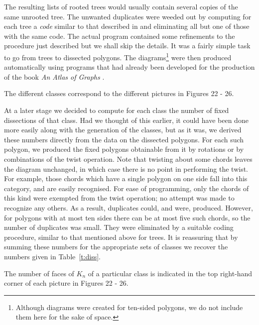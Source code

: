 \documentclass[10pt]{amsart}
\begin{document}
    The resulting lists of rooted trees would usually contain several copies of the same unrooted tree.   The unwanted duplicates were weeded out by computing for each tree a {\em code} similar to that described in \cite{r2} and eliminating all but one of those with the same code.   The actual program contained some refinements to the procedure just described but we shall skip the details. It was a fairly simple task to go from trees to dissected polygons.  The diagrams\footnote{Although diagrams were created for ten-sided polygons, we do not include them here for the sake of space.} were then produced automatically using programs that had already been developed for the production of the book {\em An Atlas of Graphs} \cite{rw}.
    
    \begin{prop}[Solution to {\em P2}\,]
    The different classes correspond to the different pictures in Figures 22 - 26.
    \end{prop}
    
    At a later stage we decided to compute for each class the number of fixed dissections of that class.   Had we thought of this earlier, it could have been done more easily along with the generation of the classes, but as it was, we derived these numbers directly from the data on the dissected polygons.   For each such polygon, we produced the fixed polygons obtainable from it by rotations or by combinations of the twist operation.   Note that twisting about some chords leaves the diagram unchanged, in which case there is no point in performing the twist.   For example, those chords which have a single polygon on one side fall into this category, and are easily recognised.   For ease of programming, only the chords of this kind were exempted from the twist operation; no attempt was made to recognize any others. As a result, duplicates could, and were, produced.   However, for polygons with at most ten sides there can be at most five such chords, so the number of duplicates was small.   They were eliminated by a suitable coding procedure, similar to that mentioned above for trees. It is reassuring that by summing these numbers for the appropriate sets of classes we recover the numbers given in Table~\ref{t:diss}.
    
    \begin{prop}[Solution to {\em P3}\,]
    The number of faces of $K_n$ of a particular class is indicated in the top right-hand corner of each picture in Figures 22 - 26.
    \label{p:cp3}
    \end{prop}
    
\end{document}

